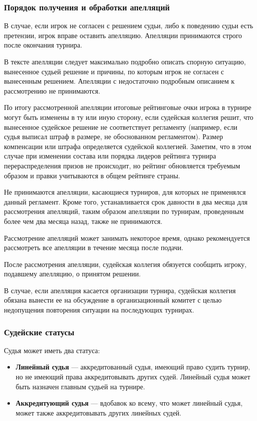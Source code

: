 \subsubsection{Порядок получения и обработки апелляций}

В случае, если игрок не согласен с решением судьи, либо к поведению судьи есть претензии, игрок вправе оставить апелляцию. Апелляции принимаются строго после окончания турнира.

В тексте апелляции следует максимально подробно описать спорную ситуацию, вынесенное судьей решение и причины, по которым игрок не согласен с вынесенным решением. Апелляции с недостаточно подробным описанием к рассмотрению не принимаются.

По итогу рассмотренной апелляции итоговые рейтинговые очки игрока в турнире могут быть изменены в ту или иную сторону, если судейская коллегия решит, что вынесенное судейское решение не соответствует регламенту (например, если судья выписал штраф в размере, не обоснованном регламентом). Размер компенсации или штрафа определяется судейской коллегией. Заметим, что в этом случае при изменении состава или порядка лидеров рейтинга турнира перераспределения призов не происходит, но рейтинг обновляется требуемым образом и правки учитываются в общем рейтинге страны.

Не принимаются апелляции, касающиеся турниров, для которых не применялся данный регламент. Кроме того, устанавливается срок давности в два месяца для рассмотрения апелляций, таким образом апелляции по турнирам, проведенным более чем два месяца назад, также не принимаются.

Рассмотрение апелляций может занимать некоторое время, однако рекомендуется рассмотреть все апелляции в течение месяца после подачи.

После рассмотрения апелляции, судейская коллегия обязуется сообщить игроку, подавшему апелляцию, о принятом решении.

В случае, если апелляция касается организации турнира, судейская коллегия обязана вынести ее на обсуждение в организационный комитет с целью недопущения повторения ситуации на последующих турнирах.

\subsubsection{Судейские статусы}

Судья может иметь два статуса:
\begin{itemize}
    \item \textbf{Линейный судья} --- аккредитованный судья, имеющий право судить турнир, но не имеющий права аккредитовывать других судей. Линейный судья может быть назначен главным судьей на турнире.
    \item \textbf{Аккредитующий судья} --- вдобавок ко всему, что может линейный судья, может также аккредитовывать других линейных судей.
\end{itemize}


